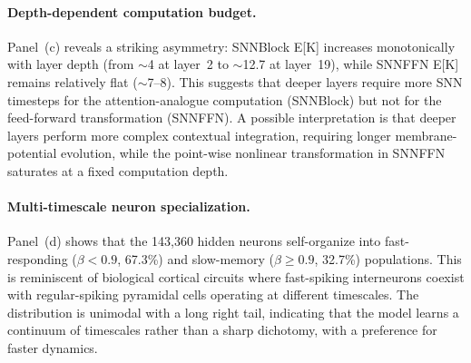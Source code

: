 \documentclass{article}
\begin{document}
\paragraph{Depth-dependent computation budget.}
Panel~(c) reveals a striking asymmetry: SNNBlock E[K] increases monotonically with layer depth (from $\sim$4 at layer~2 to $\sim$12.7 at layer~19), while SNNFFN E[K] remains relatively flat ($\sim$7--8).
This suggests that deeper layers require more SNN timesteps for the attention-analogue computation (SNNBlock) but not for the feed-forward transformation (SNNFFN).
A possible interpretation is that deeper layers perform more complex contextual integration, requiring longer membrane-potential evolution, while the point-wise nonlinear transformation in SNNFFN saturates at a fixed computation depth.

\paragraph{Multi-timescale neuron specialization.}
Panel~(d) shows that the 143,360 hidden neurons self-organize into fast-responding ($\beta < 0.9$, 67.3\%) and slow-memory ($\beta \geq 0.9$, 32.7\%) populations.
This is reminiscent of biological cortical circuits where fast-spiking interneurons coexist with regular-spiking pyramidal cells operating at different timescales.
The distribution is unimodal with a long right tail, indicating that the model learns a continuum of timescales rather than a sharp dichotomy, with a preference for faster dynamics.
\end{document}
